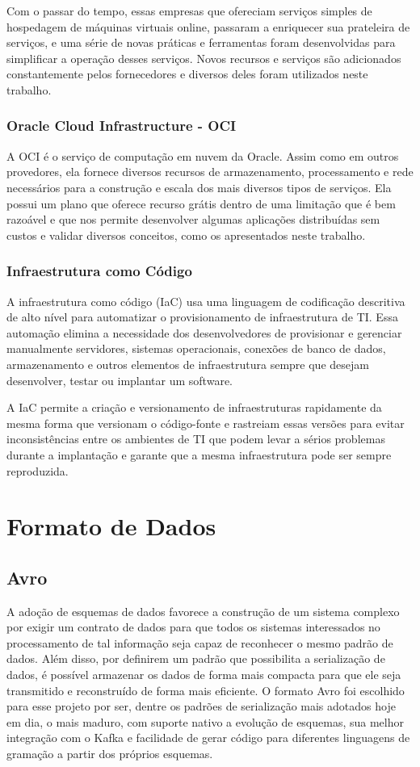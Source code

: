 \documentclass[12pt]{article}
\begin{document}
Com o passar do tempo, essas empresas que ofereciam serviços simples de hospedagem de máquinas virtuais online, passaram a enriquecer sua prateleira de serviços, e uma série de novas práticas e ferramentas foram desenvolvidas para simplificar a operação desses serviços. Novos recursos e serviços são adicionados constantemente pelos fornecedores e diversos deles foram utilizados neste trabalho. %

\subsubsection{Oracle Cloud Infrastructure - OCI}
A OCI é o serviço de computação em nuvem da Oracle. Assim como em outros provedores, ela fornece diversos recursos de armazenamento, processamento e rede necessários para a construção e escala dos mais diversos tipos de serviços. Ela possui um plano que oferece recurso grátis dentro de uma limitação que é bem razoável e que nos permite desenvolver algumas aplicações distribuídas sem custos e validar diversos conceitos, como os apresentados neste trabalho.

\subsubsection{Infraestrutura como Código}
A infraestrutura como código (IaC) usa uma linguagem de codificação descritiva de alto nível para automatizar o provisionamento de infraestrutura de TI. Essa automação elimina a necessidade dos desenvolvedores de provisionar e gerenciar manualmente servidores, sistemas operacionais, conexões de banco de dados, armazenamento e outros elementos de infraestrutura sempre que desejam desenvolver, testar ou implantar um software.

A IaC permite a criação e versionamento de infraestruturas rapidamente da mesma forma que versionam o código-fonte e rastreiam essas versões para evitar inconsistências entre os ambientes de TI que podem levar a sérios problemas durante a implantação e garante que a mesma infraestrutura pode ser sempre reproduzida.




\section{Formato de Dados}
\subsection{Avro}
A adoção de esquemas de dados favorece a construção de um sistema complexo por exigir um contrato de dados para que todos os sistemas interessados no processamento de tal informação seja capaz de reconhecer o mesmo padrão de dados. Além disso, por definirem um padrão que possibilita a serialização de dados, é possível armazenar os dados de forma mais compacta para que ele seja transmitido e reconstruído de forma mais eficiente. O formato Avro foi escolhido para esse projeto por ser, dentre os padrões de serialização mais adotados hoje em dia, o mais maduro, com suporte nativo a evolução de esquemas, sua melhor integração com o Kafka e facilidade de gerar código para diferentes linguagens de gramação a partir dos próprios esquemas.
\end{document}

